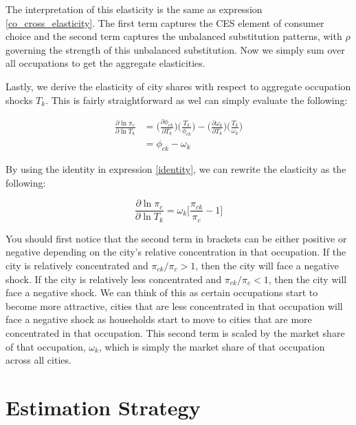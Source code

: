 \documentclass[10pt]{article}
\begin{document}
The interpretation of this elasticity is the same as expression \ref{co_cross_elasticity}. The first term captures the CES element of consumer choice and the second term captures the unbalanced substitution patterns, with $\rho$ governing the strength of this unbalanced substitution. Now we simply sum over all occupations to get the aggregate elasticities.

Lastly, we derive the elasticity of city shares with respect to aggregate occupation shocks $T_k$. This is fairly straightforward as wel can simply evaluate the following:

\begin{align*}
    \frac{\partial\ln{\pi_{c}}}{\partial\ln{T_{k}}} & = \Big(\frac{\partial{\phi_{ck}}}{\partial{T_{k}}}\Big)\Big(\frac{T_{k}}{\phi_{ck}}\Big) - \Big(\frac{\partial{\omega_{k}}}{\partial{T_{k}}}\Big)\Big(\frac{T_{k}}{\omega_{k}}\Big) \\ &= \phi_{ck}-\omega_{k}
\end{align*}

By using the identity in expression \ref{identity}, we can rewrite the elasticity as the following:

\begin{equation}
    \frac{\partial\ln{\pi_{c}}}{\partial\ln{T_{k}}} = {\omega_{k}}\Bigg[\frac{\pi_{ck}}{\pi_{c}}-1\Bigg]
\end{equation}

You should first notice that the second term in brackets can be either positive or negative depending on the city's relative concentration in that occupation. If the city is relatively concentrated and $\pi_{ck} / \pi_c > 1$, then the city will face a negative shock. If the city is relatively less concentrated and $\pi_{ck} / \pi_c < 1$, then the city will face a negative shock. We can think of this as certain occupations start to become more attractive, cities that are less concentrated in that occupation will face a negative shock as households start to move to cities that are more concentrated in that occupation. This second term is scaled by the market share of that occupation, $\omega_k$, which is simply the market share of that occupation across all cities.

\section{Estimation Strategy}

\end{document}
